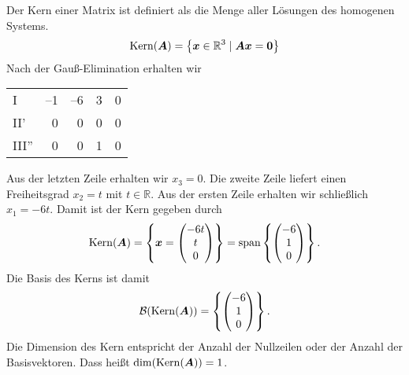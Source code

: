 {    Der Kern einer Matrix ist definiert als die Menge aller L\"osungen des homogenen Systems.
    $$
    \mathrm{Kern} ( \boldsymbol A) = \left\{ \boldsymbol x \in \mathbb{R}^3 \mid \boldsymbol A \boldsymbol x = \boldsymbol 0 \right \}
    $$
    Nach der Gau\ss -Elimination erhalten wir
        \begin{center}
            \begin{tabular}{|l|rrc|c|} \hline
                I    & 	--1 & --6   &  3  & 0 \\ 
	 			II'  & 	0   & 0     & 0   & 0 \\ 
	 			III''&	0   & 0     &  1  & 0 \\ \hline
			\end{tabular}
		\end{center}
    Aus der letzten Zeile erhalten wir $x_3 = 0$. Die zweite Zeile liefert einen Freiheitsgrad $x_2 = t$ mit $t \in \mathbb{R}$.
    Aus der ersten Zeile erhalten wir schlie\ss lich $x_1 = -6t$.
    Damit ist der Kern gegeben durch
    $$
    \mathrm{Kern} (\boldsymbol A) = \left\{\boldsymbol x = \begin{pmatrix} -6t\\t\\0 \end{pmatrix} \right\} = \mathrm{span}\left\{ \begin{pmatrix} -6\\1\\0 \end{pmatrix} \right\}.
    $$
    Die Basis des Kerns ist damit
    $$
    \mathcal B (\mathrm{Kern}(\boldsymbol A)) = \left\{ \begin{pmatrix} -6\\1\\0 \end{pmatrix} \right\}.
    $$
    Die Dimension des Kern entspricht der Anzahl der Nullzeilen oder der Anzahl der Basisvektoren.
    Dass heißt $\dim(\mathrm{Kern}( \boldsymbol A)) =1$.

}
